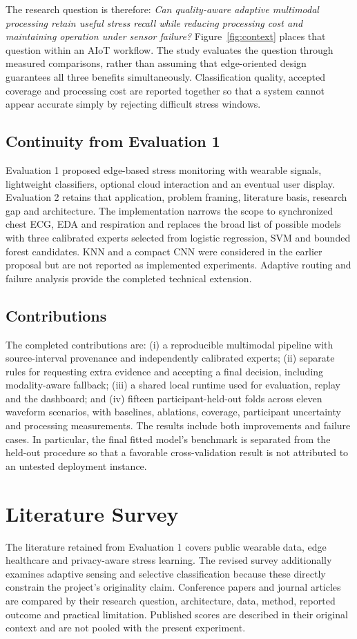 \documentclass[conference,a4paper]{IEEEtran}
\begin{document}
The research question is therefore: \emph{Can quality-aware adaptive multimodal processing retain useful stress recall while reducing processing cost and maintaining operation under sensor failure?} Figure~\ref{fig:context} places that question within an AIoT workflow. The study evaluates the question through measured comparisons, rather than assuming that edge-oriented design guarantees all three benefits simultaneously. Classification quality, accepted coverage and processing cost are reported together so that a system cannot appear accurate simply by rejecting difficult stress windows.

\subsection{Continuity from Evaluation 1}
Evaluation 1 proposed edge-based stress monitoring with wearable signals, lightweight classifiers, optional cloud interaction and an eventual user display. Evaluation 2 retains that application, problem framing, literature basis, research gap and architecture. The implementation narrows the scope to synchronized chest ECG, EDA and respiration and replaces the broad list of possible models with three calibrated experts selected from logistic regression, SVM and bounded forest candidates. KNN and a compact CNN were considered in the earlier proposal but are not reported as implemented experiments. Adaptive routing and failure analysis provide the completed technical extension.

\subsection{Contributions}
The completed contributions are: (i) a reproducible multimodal pipeline with source-interval provenance and independently calibrated experts; (ii) separate rules for requesting extra evidence and accepting a final decision, including modality-aware fallback; (iii) a shared local runtime used for evaluation, replay and the dashboard; and (iv) fifteen participant-held-out folds across eleven waveform scenarios, with baselines, ablations, coverage, participant uncertainty and processing measurements. The results include both improvements and failure cases. In particular, the final fitted model's benchmark is separated from the held-out procedure so that a favorable cross-validation result is not attributed to an untested deployment instance.

\section{Literature Survey}
The literature retained from Evaluation 1 covers public wearable data, edge healthcare and privacy-aware stress learning. The revised survey additionally examines adaptive sensing and selective classification because these directly constrain the project's originality claim. Conference papers and journal articles are compared by their research question, architecture, data, method, reported outcome and practical limitation. Published scores are described in their original context and are not pooled with the present experiment.
\end{document}
